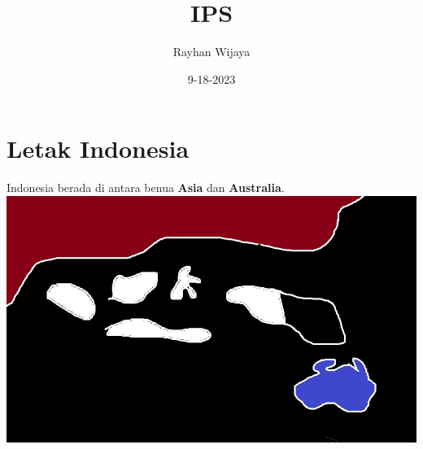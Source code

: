 \documentclass[12pt]{report}
\title{IPS}
\author{Rayhan Wijaya}
\date{9-18-2023}
\begin{document}
\maketitle

\section*{Letak Indonesia}

Indonesia berada di antara benua \textbf{Asia} dan \textbf{Australia}.
\includegraphics[scale=0.8]{indonesia-asia-australia}
\end{document}
